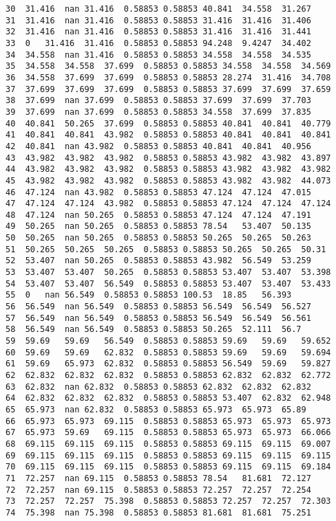 \documentclass[a4paper,11pt,onecolumn,twoside]{article}
\begin{document}
\begin{lstlisting}
30	31.416	nan	31.416	0.58853	0.58853	40.841	34.558	31.267
31	31.416	nan	31.416	0.58853	0.58853	31.416	31.416	31.406
32	31.416	nan	31.416	0.58853	0.58853	31.416	31.416	31.441
33	0	31.416	31.416	0.58853	0.58853	94.248	9.4247	34.402
34	34.558	nan	31.416	0.58853	0.58853	34.558	34.558	34.535
35	34.558	34.558	37.699	0.58853	0.58853	34.558	34.558	34.569
36	34.558	37.699	37.699	0.58853	0.58853	28.274	31.416	34.708
37	37.699	37.699	37.699	0.58853	0.58853	37.699	37.699	37.659
38	37.699	nan	37.699	0.58853	0.58853	37.699	37.699	37.703
39	37.699	nan	37.699	0.58853	0.58853	34.558	37.699	37.835
40	40.841	50.265	37.699	0.58853	0.58853	40.841	40.841	40.779
41	40.841	40.841	43.982	0.58853	0.58853	40.841	40.841	40.841
42	40.841	nan	43.982	0.58853	0.58853	40.841	40.841	40.956
43	43.982	43.982	43.982	0.58853	0.58853	43.982	43.982	43.897
44	43.982	43.982	43.982	0.58853	0.58853	43.982	43.982	43.982
45	43.982	43.982	43.982	0.58853	0.58853	43.982	43.982	44.073
46	47.124	nan	43.982	0.58853	0.58853	47.124	47.124	47.015
47	47.124	47.124	43.982	0.58853	0.58853	47.124	47.124	47.124
48	47.124	nan	50.265	0.58853	0.58853	47.124	47.124	47.191
49	50.265	nan	50.265	0.58853	0.58853	78.54	53.407	50.135
50	50.265	nan	50.265	0.58853	0.58853	50.265	50.265	50.263
51	50.265	50.265	50.265	0.58853	0.58853	50.265	50.265	50.31
52	53.407	nan	50.265	0.58853	0.58853	43.982	56.549	53.259
53	53.407	53.407	50.265	0.58853	0.58853	53.407	53.407	53.398
54	53.407	53.407	56.549	0.58853	0.58853	53.407	53.407	53.433
55	0	nan	56.549	0.58853	0.58853	100.53	18.85	56.393
56	56.549	nan	56.549	0.58853	0.58853	56.549	56.549	56.527
57	56.549	nan	56.549	0.58853	0.58853	56.549	56.549	56.561
58	56.549	nan	56.549	0.58853	0.58853	50.265	52.111	56.7
59	59.69	59.69	56.549	0.58853	0.58853	59.69	59.69	59.652
60	59.69	59.69	62.832	0.58853	0.58853	59.69	59.69	59.694
61	59.69	65.973	62.832	0.58853	0.58853	56.549	59.69	59.827
62	62.832	62.832	62.832	0.58853	0.58853	62.832	62.832	62.772
63	62.832	nan	62.832	0.58853	0.58853	62.832	62.832	62.832
64	62.832	62.832	62.832	0.58853	0.58853	53.407	62.832	62.948
65	65.973	nan	62.832	0.58853	0.58853	65.973	65.973	65.89
66	65.973	65.973	69.115	0.58853	0.58853	65.973	65.973	65.973
67	65.973	59.69	69.115	0.58853	0.58853	65.973	65.973	66.066
68	69.115	69.115	69.115	0.58853	0.58853	69.115	69.115	69.007
69	69.115	69.115	69.115	0.58853	0.58853	69.115	69.115	69.115
70	69.115	69.115	69.115	0.58853	0.58853	69.115	69.115	69.184
71	72.257	nan	69.115	0.58853	0.58853	78.54	81.681	72.127
72	72.257	nan	69.115	0.58853	0.58853	72.257	72.257	72.254
73	72.257	72.257	75.398	0.58853	0.58853	72.257	72.257	72.303
74	75.398	nan	75.398	0.58853	0.58853	81.681	81.681	75.251

\end{lstlisting}
\end{document}
